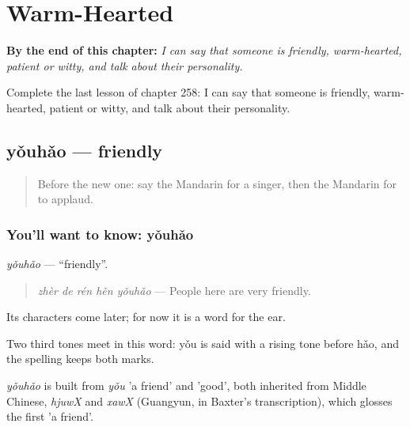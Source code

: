 
\chapter{Warm-Hearted}
\label{ch:zh-warm-hearted}

\begin{chapteropening}
\textbf{By the end of this chapter:} \emph{I can say that someone is friendly, warm-hearted, patient or witty, and talk about their personality.}

Complete the last lesson of chapter 258: I can say that someone is friendly, warm-hearted, patient or witty, and talk about their personality.
\end{chapteropening}

\section[yǒuhǎo]{yǒuhǎo — friendly}

\label{lesson:ZH-C258-youhao}



\begin{quote}
Before the new one: say the Mandarin for a singer, then the Mandarin for to applaud.
\end{quote}

\subsection*{You'll want to know: yǒuhǎo}
\emph{yǒuhǎo} — \textquotedblleft{}friendly\textquotedblright{}.

\begin{quote}
\emph{zhèr de rén hěn yǒuhǎo} — People here are very friendly.
\end{quote}

Its characters come later; for now it is a word for the ear.

Two third tones meet in this word: yǒu is said with a rising tone before hǎo, and the spelling keeps both marks.

\begin{cousinweb}
\emph{yǒuhǎo} is built from \emph{yǒu} 'a friend' and  'good', both inherited from Middle Chinese, \emph{hjuwX} and \emph{xawX} (Guangyun, in Baxter's transcription), which glosses the first 'a friend'.
\end{cousinweb}

